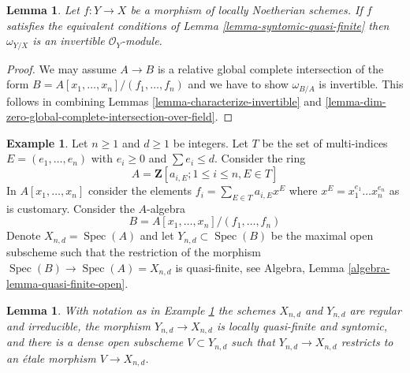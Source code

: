 \documentclass[10pt,a4paper]{amsart}
\theoremstyle{plain}
\newtheorem{lemma}[subsection]{Lemma}
\theoremstyle{definition}
\newtheorem{example}[subsection]{Example}
\theoremstyle{remark}
\numberwithin{equation}{subsection}
\def\Spec{\mathop{\mathrm{Spec}}}
\begin{document}
\begin{lemma}
\label{lemma-dualizing-syntomic-quasi-finite}
Let $f : Y \to X$ be a morphism of locally Noetherian schemes. If $f$
satisfies the equivalent conditions of Lemma \ref{lemma-syntomic-quasi-finite}
then $\omega_{Y/X}$ is an invertible $\mathcal{O}_Y$-module.
\end{lemma}

\begin{proof}
We may assume $A \to B$ is a relative global complete
intersection of the form $B = A[x_1, \ldots, x_n]/(f_1, \ldots, f_n)$
and we have to show $\omega_{B/A}$ is invertible.
This follows in combining Lemmas \ref{lemma-characterize-invertible} and
\ref{lemma-dim-zero-global-complete-intersection-over-field}.
\end{proof}

\begin{example}
\label{example-universal-quasi-finite-syntomic}
Let $n \geq 1$ and $d \geq 1$ be integers. Let $T$ be the set of
multi-indices $E = (e_1, \ldots, e_n)$ with $e_i \geq 0$ and
$\sum e_i \leq d$. Consider the ring
$$
A = \mathbf{Z}[a_{i, E} ; 1 \leq i \leq n, E \in T]
$$
In $A[x_1, \ldots, x_n]$ consider the elements
$f_i = \sum_{E \in T} a_{i, E} x^E$ where $x^E = x_1^{e_1} \ldots x_n^{e_n}$
as is customary. Consider the $A$-algebra
$$
B = A[x_1, \ldots, x_n]/(f_1, \ldots, f_n)
$$
Denote $X_{n, d} = \Spec(A)$ and let $Y_{n, d} \subset \Spec(B)$
be the maximal open subscheme such that the restriction of the
morphism $\Spec(B) \to \Spec(A) = X_{n, d}$ is quasi-finite, see
Algebra, Lemma \ref{algebra-lemma-quasi-finite-open}.
\end{example}

\begin{lemma}
\label{lemma-universal-quasi-finite-syntomic-etale}
With notation as in Example \ref{example-universal-quasi-finite-syntomic}
the schemes $X_{n, d}$ and $Y_{n, d}$ are regular and irreducible,
the morphism $Y_{n, d} \to X_{n, d}$ is locally quasi-finite and
syntomic, and there is a dense open subscheme $V \subset Y_{n, d}$
such that $Y_{n, d} \to X_{n, d}$ restricts to an \'etale morphism
$V \to X_{n, d}$.
\end{lemma}
\end{document}
